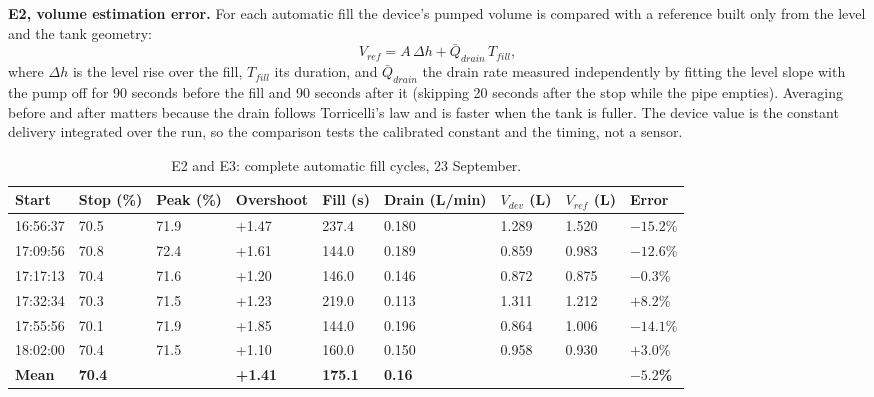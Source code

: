 \textbf{E2, volume estimation error.} For each automatic fill the device's pumped volume is compared with a reference built only from the level and the tank geometry:
\begin{equation}
V_{ref} = A\,\Delta h + \bar{Q}_{drain}\,T_{fill},
\end{equation}
where $\Delta h$ is the level rise over the fill, $T_{fill}$ its duration, and $\bar{Q}_{drain}$ the drain rate measured independently by fitting the level slope with the pump off for 90 seconds before the fill and 90 seconds after it (skipping 20 seconds after the stop while the pipe empties). Averaging before and after matters because the drain follows Torricelli's law and is faster when the tank is fuller. The device value is the constant delivery integrated over the run, so the comparison tests the calibrated constant and the timing, not a sensor.

\begin{table}[H]
\caption{E2 and E3: complete automatic fill cycles, 23 September.}
\label{tab:cycles}
\centering
\renewcommand{\arraystretch}{1.05}
\small\setlength{\tabcolsep}{4pt}
\begin{tabular}{|p{1.25cm}|p{1.05cm}|p{1.05cm}|p{1.3cm}|p{1.05cm}|p{1.3cm}|p{1.15cm}|p{1.15cm}|p{1.4cm}|}
\hline
\textbf{Start} & \textbf{Stop (\%)} & \textbf{Peak (\%)} & \textbf{Over\-shoot} & \textbf{Fill (s)} & \textbf{Drain (L/min)} & \textbf{$V_{dev}$ (L)} & \textbf{$V_{ref}$ (L)} & \textbf{Error} \\
\hline
16:56:37 & 70.5 & 71.9 & +1.47 & 237.4 & 0.180 & 1.289 & 1.520 & $-15.2$\% \\ \hline
17:09:56 & 70.8 & 72.4 & +1.61 & 144.0 & 0.189 & 0.859 & 0.983 & $-12.6$\% \\ \hline
17:17:13 & 70.4 & 71.6 & +1.20 & 146.0 & 0.146 & 0.872 & 0.875 & $-0.3$\% \\ \hline
17:32:34 & 70.3 & 71.5 & +1.23 & 219.0 & 0.113 & 1.311 & 1.212 & $+8.2$\% \\ \hline
17:55:56 & 70.1 & 71.9 & +1.85 & 144.0 & 0.196 & 0.864 & 1.006 & $-14.1$\% \\ \hline
18:02:00 & 70.4 & 71.5 & +1.10 & 160.0 & 0.150 & 0.958 & 0.930 & $+3.0$\% \\ \hline
\textbf{Mean} & \textbf{70.4} & & \textbf{+1.41} & \textbf{175.1} & \textbf{0.16} & & & $\mathbf{-5.2}$\textbf{\%} \\ \hline
\end{tabular}
\end{table}

